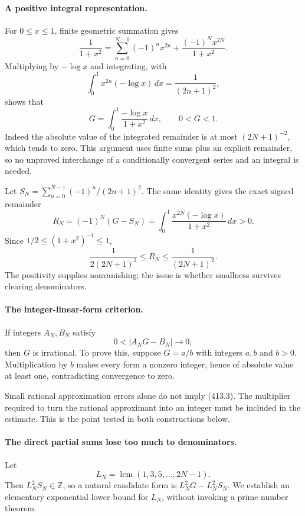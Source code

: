\documentclass[11pt]{article}
\begin{document}
\paragraph{A positive integral representation.}
For $0\le x\le1$, finite geometric summation gives
\[
 \frac1{1+x^2}=\sum_{n=0}^{N-1}(-1)^nx^{2n}
               +\frac{(-1)^Nx^{2N}}{1+x^2}.
\]
Multiplying by $-\log x$ and integrating, with
\[
 \int_0^1x^{2n}(-\log x)\,dx=\frac1{(2n+1)^2},
\]
shows that
\[
 G=\int_0^1\frac{-\log x}{1+x^2}\,dx,
 \qquad 0<G<1. \tag{413.1}
\]
Indeed the absolute value of the integrated remainder is at most $(2N+1)^{-2}$, which tends to zero. This argument uses finite sums plus an explicit remainder, so no unproved interchange of a conditionally convergent series and an integral is needed.

Let $S_N=\sum_{n=0}^{N-1}(-1)^n/(2n+1)^2$. The same identity gives the exact signed remainder
\[
 R_N=(-1)^N(G-S_N)
     =\int_0^1\frac{x^{2N}(-\log x)}{1+x^2}\,dx>0.
\]
Since $1/2\le(1+x^2)^{-1}\le1$,
\[
 \frac1{2(2N+1)^2}\le R_N\le\frac1{(2N+1)^2}.
 \tag{413.2}
\]
The positivity supplies nonvanishing; the issue is whether smallness survives clearing denominators.

\paragraph{The integer-linear-form criterion.}
If integers $A_N,B_N$ satisfy
\[
 0<|A_NG-B_N|\longrightarrow0,
 \tag{413.3}
\]
then $G$ is irrational. To prove this, suppose $G=a/b$ with integers $a,b$ and $b>0$. Multiplication by $b$ makes every form a nonzero integer, hence of absolute value at least one, contradicting convergence to zero.

Small rational approximation errors alone do not imply (413.3). The multiplier required to turn the rational approximant into an integer must be included in the estimate. This is the point tested in both constructions below.

\paragraph{The direct partial sums lose too much to denominators.}
Let
\[
 L_N=\operatorname{lcm}(1,3,5,\ldots,2N-1).
\]
Then $L_N^2S_N\in\mathbb Z$, so a natural candidate form is $L_N^2G-L_N^2S_N$. We establish an elementary exponential lower bound for $L_N$, without invoking a prime number theorem.
\end{document}
